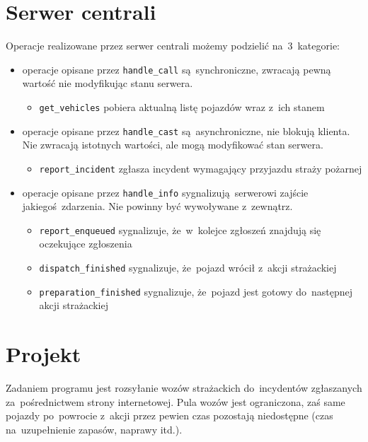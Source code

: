 \documentclass{article}
\begin{document}
\section{Serwer centrali}
Operacje realizowane przez serwer centrali możemy podzielić na~3~kategorie:
\begin{itemize}
	\item operacje opisane przez \texttt{handle\_call} są~synchroniczne, zwracają pewną wartość nie modyfikując stanu serwera.
	\begin{itemize}
		\item \texttt{get\_vehicles} pobiera aktualną listę pojazdów wraz z~ich stanem
	\end{itemize}

	\item operacje opisane przez \texttt{handle\_cast} są~asynchroniczne, nie blokują klienta. Nie zwracają istotnych wartości, ale mogą modyfikować stan serwera.
	\begin{itemize}
		\item \texttt{report\_incident} zgłasza incydent wymagający przyjazdu straży pożarnej
	\end{itemize}

	\item operacje opisane przez \texttt{handle\_info} sygnalizują serwerowi zajście jakiegoś zdarzenia. Nie powinny być wywoływane z~zewnątrz.
	\begin{itemize}
		\item \texttt{report\_enqueued} sygnalizuje, że~w~kolejce zgłoszeń znajdują się oczekujące zgłoszenia
		\item \texttt{dispatch\_finished} sygnalizuje, że~pojazd wrócił z~akcji strażackiej
		\item \texttt{preparation\_finished} sygnalizuje, że~pojazd jest gotowy do~następnej akcji strażackiej
	\end{itemize}
\end{itemize}

\section{Projekt}
Zadaniem programu jest rozsyłanie wozów strażackich do~incydentów zgłaszanych za~pośrednictwem strony internetowej. Pula wozów jest ograniczona, zaś same pojazdy po~powrocie z~akcji przez pewien czas pozostają niedostępne (czas na~uzupełnienie zapasów, naprawy itd.).
\end{document}
